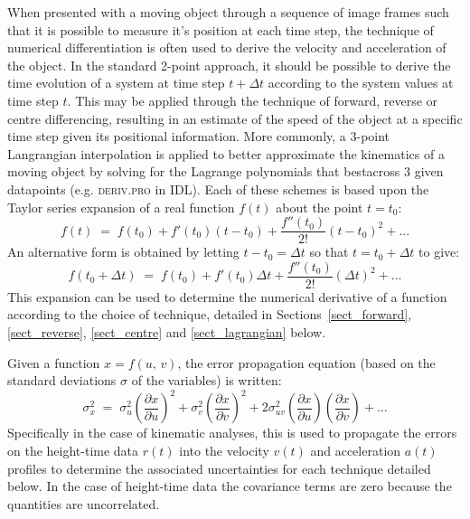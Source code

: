 \documentclass[namedreferences]{SolarPhysics}
\begin{document}
\begin{article}
When presented with a moving object through a sequence of image frames such that it is possible to measure it's position at each time step, the technique of numerical differentiation is often used to derive the velocity and acceleration of the object. In the standard 2-point approach, it should be possible to derive the time evolution of a system at time step $t+\Delta t$ according to the system values at time step $t$. This may be applied through the technique of forward, reverse or centre differencing, resulting in an estimate of the speed of the object at a specific time step given its positional information. More commonly, a 3-point Langrangian interpolation is applied to better approximate the kinematics of a moving object by solving for the Lagrange polynomials that bestacross 3 given datapoints (e.g. \textsc{deriv.pro} in IDL). Each of these schemes is based upon the Taylor series expansion of a real function $f(t)$ about the point $t=t_0$:
\begin{equation}
\label{taylor1}
f(t) \; = \; f(t_0) + f'(t_0)(t-t_0) +  \frac{f''(t_0)}{2!}(t-t_0)^{2}   + ...
\end{equation}
An alternative form is obtained by letting $t-t_0=\Delta t$ so that $t=t_0+\Delta t$ to give:
\begin{equation}
\label{taylor2}
f(t_0+\Delta t) \; = \; f(t_0)+f'(t_0)\Delta t +  \frac{f''(t_0)}{2!}(\Delta t)^{2}  + ...
\end{equation}
This expansion can be used to determine the numerical derivative of a function according to the choice of technique, detailed in Sections~\ref{sect_forward}, \ref{sect_reverse}, \ref{sect_centre} and \ref{sect_lagrangian} below.

Given a function $x=f(u,\,v)$, the error propagation equation (based on the standard deviations $\sigma$ of the variables) is written:
\begin{equation}
\label{eqn_errorprop}
\sigma_x^2 \; = \; \sigma_u^2 \left(\frac{\partial x}{\partial u}\right) ^2 + \sigma_v^2 \left( \frac{\partial x}{\partial v} \right) ^2 + 2 \sigma_{uv}^2 \left( \frac{\partial x}{\partial u} \right) \left( \frac{\partial x}{\partial v} \right) + ...
\end{equation}
Specifically in the case of kinematic analyses, this is used to propagate the errors on the height-time data $r(t)$ into the velocity $v(t)$ and acceleration $a(t)$ profiles to determine the associated uncertainties for each technique detailed below. In the case of height-time data the covariance terms are zero because the quantities are uncorrelated.


\end{article}
\end{document}
